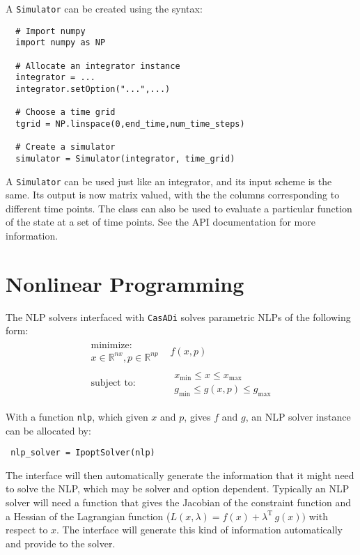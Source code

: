\documentclass[a4paper,12pt]{book}
\newcommand{\CasADi}{\texttt{CasADi}\xspace}
\begin{document}
A \texttt{Simulator} can be created using the syntax:
\begin{verbatim}
  # Import numpy
  import numpy as NP

  # Allocate an integrator instance
  integrator = ...
  integrator.setOption("...",...)

  # Choose a time grid
  tgrid = NP.linspace(0,end_time,num_time_steps)

  # Create a simulator
  simulator = Simulator(integrator, time_grid)
\end{verbatim}

A \texttt{Simulator} can be used just like an integrator, and its input scheme is the same. Its output is now matrix valued, with the the columns corresponding to different time points. The class can also be used to evaluate a particular function of the state at a set of time points. See the API documentation for more information.

\chapter{Nonlinear Programming}
The NLP solvers interfaced with \CasADi solves parametric NLPs of the following form:
\begin{equation}
\begin{array}{cc}
\begin{array}{c}
\text{minimize:} \\
x \in \mathbb{R}^{nx}, p \in \mathbb{R}^{np}
\end{array}
&
f(x,p)
\\
\begin{array}{c}
\text{subject to:}
\end{array}
&
\begin{array}{c}
x_{\min} \le x \le x_{\max} \\
g_{\min} \le g(x,p) \le g_{\max}
\end{array}
\end{array}
\end{equation}

With a function \texttt{nlp}, which given $x$ and $p$, gives $f$ and $g$, an NLP solver instance can be allocated by:
\begin{verbatim}
 nlp_solver = IpoptSolver(nlp)
\end{verbatim}

The interface will then automatically generate the information that it might need to solve the NLP, which may be solver and option dependent. Typically an NLP solver will need a function that gives the Jacobian of the constraint function and a Hessian of the Lagrangian function ($L(x,\lambda) = f(x) + \lambda^{\text{T}} \, g(x))$ with respect to $x$. The interface will generate this kind of information automatically and provide to the solver.
\end{document}

